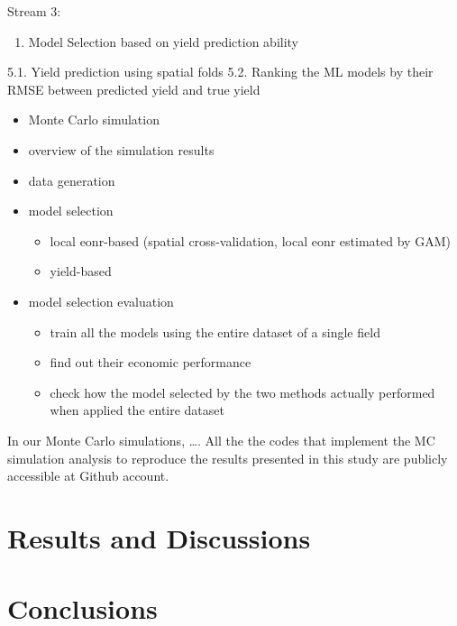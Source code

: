 \documentclass[
  12pt,
]{article}
\providecommand{\tightlist}{%
  \setlength{\itemsep}{0pt}\setlength{\parskip}{0pt}}
\begin{document}
Stream 3:

\begin{enumerate}
\def\labelenumi{\arabic{enumi}.}
\setcounter{enumi}{4}
\tightlist
\item
  Model Selection based on yield prediction ability
\end{enumerate}

5.1. Yield prediction using spatial folds
5.2. Ranking the ML models by their RMSE between predicted yield and true yield

\begin{itemize}
\item
  Monte Carlo simulation
\item
  overview of the simulation results
\item
  data generation
\item
  model selection

  \begin{itemize}
  \item
    local eonr-based (spatial cross-validation, local eonr estimated by GAM)
  \item
    yield-based
  \end{itemize}
\item
  model selection evaluation

  \begin{itemize}
  \item
    train all the models using the entire dataset of a single field
  \item
    find out their economic performance
  \item
    check how the model selected by the two methods actually performed when applied the entire dataset
  \end{itemize}
\end{itemize}

In our Monte Carlo simulations, \ldots. All the the codes that implement the MC simulation analysis to reproduce the results presented in this study are publicly accessible at { Github account}.

\hypertarget{results-and-discussions}{%
\section{Results and Discussions}\label{results-and-discussions}}

\hypertarget{conclusions}{%
\section{Conclusions}\label{conclusions}}
\end{document}
